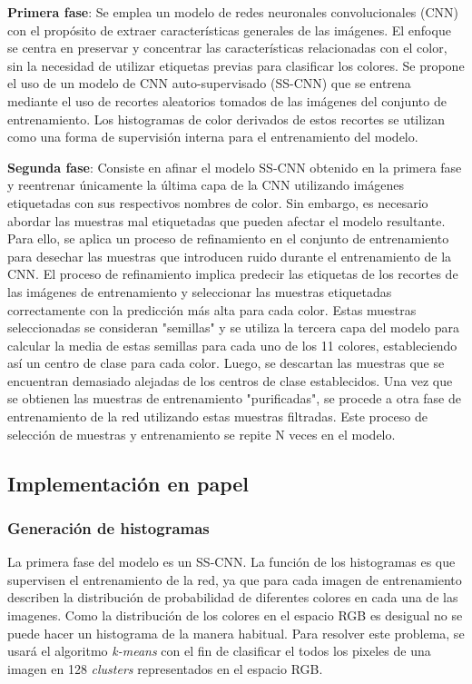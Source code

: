 \documentclass[14pt,a4paper]{report}
\begin{document}
\textbf{Primera fase}: Se emplea un modelo de redes neuronales convolucionales (CNN) con el propósito de extraer características generales de las imágenes. El enfoque se centra en preservar y concentrar las características relacionadas con el color, sin la necesidad de utilizar etiquetas previas para clasificar los colores. Se propone el uso de un modelo de CNN auto-supervisado (SS-CNN) que se entrena mediante el uso de recortes aleatorios tomados de las imágenes del conjunto de entrenamiento. Los histogramas de color derivados de estos recortes se utilizan como una forma de supervisión interna para el entrenamiento del modelo.

\textbf{Segunda fase}: Consiste en afinar el modelo SS-CNN obtenido en la primera fase y reentrenar únicamente la última capa de la CNN utilizando imágenes etiquetadas con sus respectivos nombres de color. Sin embargo, es necesario abordar las muestras mal etiquetadas que pueden afectar el modelo resultante. Para ello, se aplica un proceso de refinamiento en el conjunto de entrenamiento para desechar las muestras que introducen ruido durante el entrenamiento de la CNN. El proceso de refinamiento implica predecir las etiquetas de los recortes de las imágenes de entrenamiento y seleccionar las muestras etiquetadas correctamente con la predicción más alta para cada color. Estas muestras seleccionadas se consideran "semillas" y se utiliza la tercera capa del modelo para calcular la media de estas semillas para cada uno de los 11 colores, estableciendo así un centro de clase para cada color. Luego, se descartan las muestras que se encuentran demasiado alejadas de los centros de clase establecidos. Una vez que se obtienen las muestras de entrenamiento "purificadas", se procede a otra fase de entrenamiento de la red utilizando estas muestras filtradas. Este proceso de selección de muestras y entrenamiento se repite N veces en el modelo.

\subsection*{Implementación en papel}

\subsubsection*{Generación de histogramas}
La primera fase del modelo es un SS-CNN. La función de los histogramas es que supervisen el entrenamiento de la red, ya que para cada imagen de entrenamiento describen la distribución de probabilidad de diferentes colores en cada una de las imagenes. Como la distribución de los colores en el espacio RGB es desigual no se puede hacer un histograma de la manera habitual. Para resolver este problema, se usará el algoritmo \textit{k-means} con el fin de clasificar el todos  los pixeles de una imagen en 128 \textit{clusters} representados en el espacio RGB.
\end{document}
